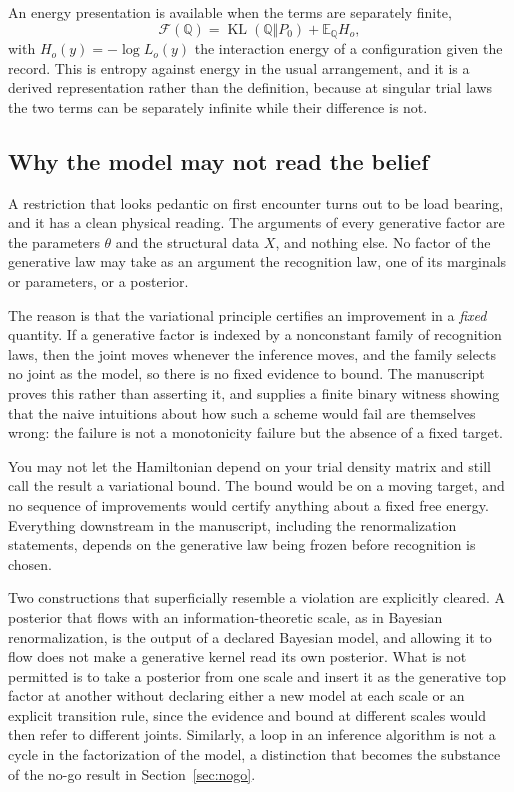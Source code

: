 \documentclass[11pt,letterpaper]{article}
\newcommand{\KL}{\operatorname{KL}}
\newcommand{\Rec}{\mathbb Q}
\newcommand{\Ex}{\mathbb E}
\begin{document}
An energy presentation is available when the terms are separately finite,
\begin{equation}
  \mathcal F(\Rec)=\KL(\Rec\Vert P_0)+\Ex_{\Rec}H_o,
  \label{eq:energy-form}
\end{equation}
with \(H_o(y)=-\log L_o(y)\) the interaction energy of a configuration given the record. This is entropy against energy in the usual arrangement, and it is a derived representation rather than the definition, because at singular trial laws the two terms can be separately infinite while their difference is not.

\subsection{Why the model may not read the belief}

A restriction that looks pedantic on first encounter turns out to be load bearing, and it has a clean physical reading. The arguments of every generative factor are the parameters \(\theta\) and the structural data \(X\), and nothing else. No factor of the generative law may take as an argument the recognition law, one of its marginals or parameters, or a posterior.

The reason is that the variational principle certifies an improvement in a \emph{fixed} quantity. If a generative factor is indexed by a nonconstant family of recognition laws, then the joint moves whenever the inference moves, and the family selects no joint as the model, so there is no fixed evidence to bound. The manuscript proves this rather than asserting it, and supplies a finite binary witness showing that the naive intuitions about how such a scheme would fail are themselves wrong: the failure is not a monotonicity failure but the absence of a fixed target.

\begin{physicalreading}
You may not let the Hamiltonian depend on your trial density matrix and still call the result a variational bound. The bound would be on a moving target, and no sequence of improvements would certify anything about a fixed free energy. Everything downstream in the manuscript, including the renormalization statements, depends on the generative law being frozen before recognition is chosen.
\end{physicalreading}

Two constructions that superficially resemble a violation are explicitly cleared. A posterior that flows with an information-theoretic scale, as in Bayesian renormalization, is the output of a declared Bayesian model, and allowing it to flow does not make a generative kernel read its own posterior. What is not permitted is to take a posterior from one scale and insert it as the generative top factor at another without declaring either a new model at each scale or an explicit transition rule, since the evidence and bound at different scales would then refer to different joints. Similarly, a loop in an inference algorithm is not a cycle in the factorization of the model, a distinction that becomes the substance of the no-go result in Section~\ref{sec:nogo}.
\end{document}
